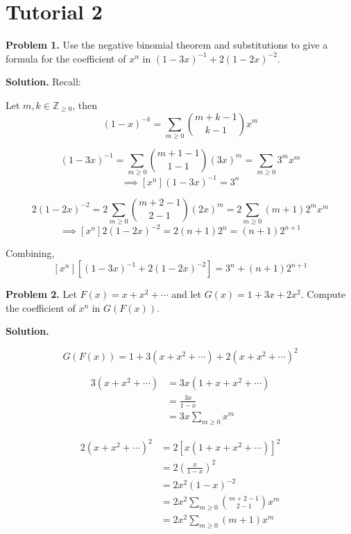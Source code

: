 \section{Tutorial 2}

\textbf{Problem 1.}
Use the negative binomial theorem and substitutions to give a formula for the
coefficient of $ x^n $ in $ (1-3x)^{-1} + 2(1-2x)^{-2} $.

\textbf{Solution.}
Recall:
\begin{thmbox}
    \begin{theorem}
        Let $ m,k\in\mathbb{Z}_{\geqslant 0} $, then
        \[ (1-x)^{-k}=\sum\limits_{m\geqslant 0}\binom{m+k-1}{k-1}x^m \]
    \end{theorem}
\end{thmbox}

\[ (1-3x)^{-1}=\sum\limits_{m\geqslant 0}\binom{m+1-1}{1-1} (3x)^m
    =\sum\limits_{m\geqslant 0} 3^m x^m \]
\[ \implies [x^n](1-3x)^{-1}
    =3^n \]

\[ 2(1-2x)^{-2}=2\sum\limits_{m\geqslant 0}\binom{m+2-1}{2-1}(2x)^m
    =2\sum\limits_{m\geqslant 0} (m+1)2^m x^m   \]
\[ \implies [x^n]2(1-2x)^{-2}
    =2(n+1)2^n=(n+1)2^{n+1} \]

Combining,
\[ [x^n]\left[ (1-3x)^{-1} + 2(1-2x)^{-2} \right]
    =3^n+(n+1) 2^{n+1} \]

\textbf{Problem 2.}
Let $ F(x)=x+x^2+\cdots $ and let $ G(x)=1+3x+2x^2 $. Compute the coefficient
of $ x^n $ in $ G(F(x)) $.

\textbf{Solution.}

\[ G(F(x))=1+3(x+x^2+\cdots)+2(x+x^2+\cdots)^2 \]

\begin{align*}
    3(x+x^2+\cdots)
     & = 3x(1+x+x^2+\cdots)                \\
     & =\frac{3x}{1-x}                     \\
     & = 3x \sum\limits_{m\geqslant 0} x^m
\end{align*}

\begin{align*}
    2(x+x^2+\cdots)^2
     & = 2\left[x(1+x+x^2+\cdots)\right]^2                   \\
     & =2\left( \frac{x}{1-x}  \right)^2                     \\
     & =2x^2(1-x)^{-2}                                       \\
     & =2x^2 \sum\limits_{m\geqslant 0}\binom{m+2-1}{2-1}x^m \\
     & =2x^2 \sum\limits_{m\geqslant 0}(m+1)x^m
\end{align*}

